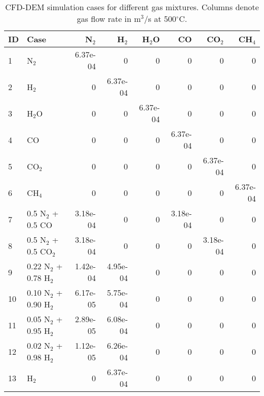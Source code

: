 
\begin{table}[H]
    \centering
    \caption{CFD-DEM simulation cases for different gas mixtures. Columns denote gas flow rate in m$^3$/s at 500$^\circ$C.}
    \begin{tabular}{llrrrrrr}
        \toprule
        ID & Case                    & N$_2$     & H$_2$    & H$_2$O   & CO       & CO$_2$    & CH$_4$   \\
        \midrule
        1  & N$_2$                   & 6.37e-04  & 0        & 0        & 0        & 0         & 0        \\
        2  & H$_2$                   & 0         & 6.37e-04 & 0        & 0        & 0         & 0        \\
        3  & H$_2$O                  & 0         & 0        & 6.37e-04 & 0        & 0         & 0        \\
        4  & CO                      & 0         & 0        & 0        & 6.37e-04 & 0         & 0        \\
        5  & CO$_2$                  & 0         & 0        & 0        & 0        & 6.37e-04  & 0        \\
        6  & CH$_4$                  & 0         & 0        & 0        & 0        & 0         & 6.37e-04 \\
        7  & 0.5 N$_2$ + 0.5 CO      & 3.18e-04  & 0        & 0        & 3.18e-04 & 0         & 0        \\
        8  & 0.5 N$_2$ + 0.5 CO$_2$  & 3.18e-04  & 0        & 0        & 0        & 3.18e-04  & 0        \\
        9  & 0.22 N$_2$ + 0.78 H$_2$ & 1.42e-04  & 4.95e-04 & 0        & 0        & 0         & 0        \\
        10 & 0.10 N$_2$ + 0.90 H$_2$ & 6.17e-05  & 5.75e-04 & 0        & 0        & 0         & 0        \\
        11 & 0.05 N$_2$ + 0.95 H$_2$ & 2.89e-05  & 6.08e-04 & 0        & 0        & 0         & 0        \\
        12 & 0.02 N$_2$ + 0.98 H$_2$ & 1.12e-05  & 6.26e-04 & 0        & 0        & 0         & 0        \\
        13 & H$_2$                   & 0         & 6.37e-04 & 0        & 0        & 0         & 0        \\
        \bottomrule
    \end{tabular}
    \label{tab:flowrates}
\end{table}
